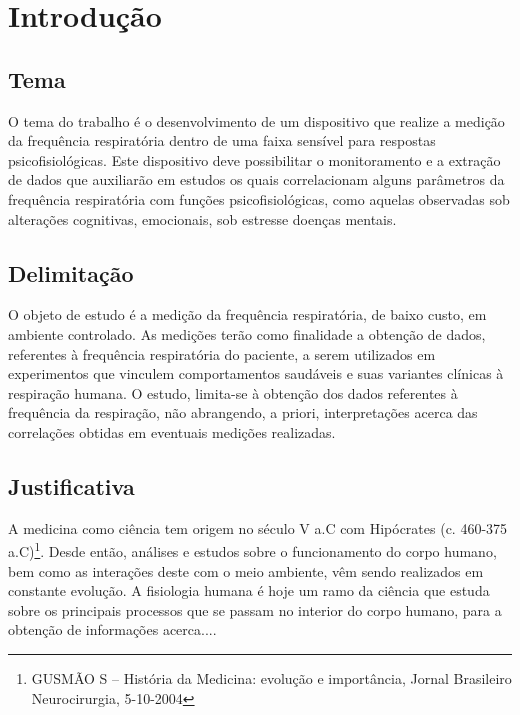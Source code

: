   \chapter{Introdução}
  
  \section{Tema}
  
  O tema do trabalho é o desenvolvimento de um dispositivo que realize a medição da frequência respiratória dentro de uma faixa sensível para respostas psicofisiológicas. Este dispositivo deve possibilitar o monitoramento e a extração de dados que auxiliarão em estudos os quais correlacionam alguns parâmetros da frequência respiratória com funções psicofisiológicas, como aquelas observadas sob alterações cognitivas, emocionais, sob estresse  doenças mentais.
  
  \section{Delimitação}
  
  O objeto de estudo é a medição da frequência respiratória, de baixo custo, em ambiente controlado. As medições terão como finalidade a obtenção de dados, referentes à frequência respiratória do paciente, a serem utilizados em experimentos que vinculem comportamentos saudáveis e suas variantes clínicas à respiração humana. O estudo, limita-se à obtenção dos dados referentes à frequência da respiração, não abrangendo, a priori, interpretações acerca das correlações obtidas em eventuais medições realizadas.
  
  \section{Justificativa}
 
   A medicina como ciência tem origem no século V a.C com Hipócrates (c. 460-375 a.C)\footnote{GUSMÃO S – História da Medicina: evolução e importância, Jornal Brasileiro Neurocirurgia, 5-10-2004}. Desde então, análises e estudos sobre o funcionamento do corpo humano, bem como as interações deste com o meio ambiente, vêm sendo realizados em constante evolução. A fisiologia humana é hoje um ramo da ciência que estuda sobre os principais processos que se passam no interior do corpo humano, para a obtenção de informações acerca....
   
 
